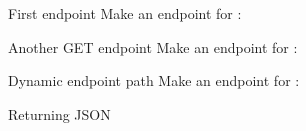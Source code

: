 \documentclass[../index.tex]{subfiles}
\begin{document}
\renewcommand{\currenttitle}{First endpoint}
\begin{frame}[fragile]{\currenttitle}
  Make an endpoint for \texttt{\urlendpoint{}}:
  \vspace*{1em}
\end{frame}

\renewcommand{\currenttitle}{Another GET endpoint}
\begin{frame}[fragile]{\currenttitle}
  Make an endpoint for \texttt{}:
  \vspace*{1em}
\end{frame}

\renewcommand{\currenttitle}{Dynamic endpoint path}
\begin{frame}[fragile]{\currenttitle}
  Make an endpoint for \texttt{}:
  \vspace*{1em}
\end{frame}

\renewcommand{\currenttitle}{Returning JSON}
\begin{frame}[fragile]{\currenttitle}
\end{frame}
\end{document}
